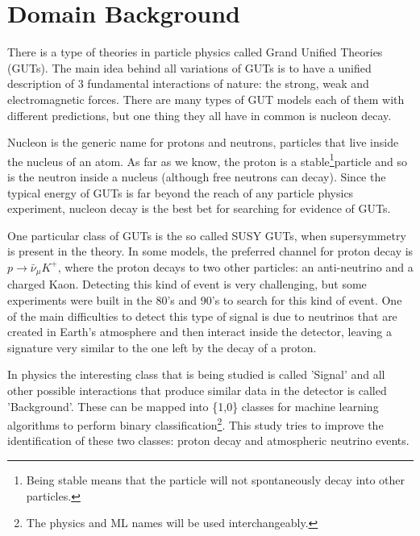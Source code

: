 
\section{Domain Background} \label{Domain}
There is a type of theories in particle physics called Grand Unified Theories (GUTs). The main idea behind all variations of GUTs is to have a unified description of 3 fundamental interactions of nature: the strong, weak and electromagnetic forces. There are many types of GUT models \cite{GUTs} each of them with different predictions, but one thing they all have in common is nucleon decay.

Nucleon is the generic name for protons and neutrons, particles that live inside the nucleus of an atom. As far as we know, the proton is a stable\footnote{Being stable means that the particle will not spontaneously decay into other particles.}particle and so is the neutron inside a nucleus (although free neutrons can decay). Since the typical energy of GUTs is far beyond the reach of any particle physics experiment, nucleon decay is the best bet for searching for evidence of GUTs.

One particular class of GUTs is the so called SUSY GUTs, when supersymmetry is present in the theory. In some models, the preferred channel for proton decay is $p\rightarrow \bar{\nu}_{\mu}K^{+}$, where the proton decays to two other particles: an anti-neutrino and a charged Kaon. Detecting this kind of event is very challenging, but some experiments were built in the 80's and 90's to search for this kind of event. One of the main difficulties to detect this type of signal is due to neutrinos that are created in Earth's atmosphere and then interact inside the detector, leaving a signature very similar to the one left by the decay of a proton.

In physics the interesting class that is being studied is called 'Signal' and all other possible interactions that produce similar data in the detector is called 'Background'. These can be mapped into \{1,0\} classes for machine learning algorithms to perform binary classification\footnote{The physics and ML names will be used interchangeably.}.  This study tries to improve the identification of these two classes: proton decay and atmospheric neutrino events.